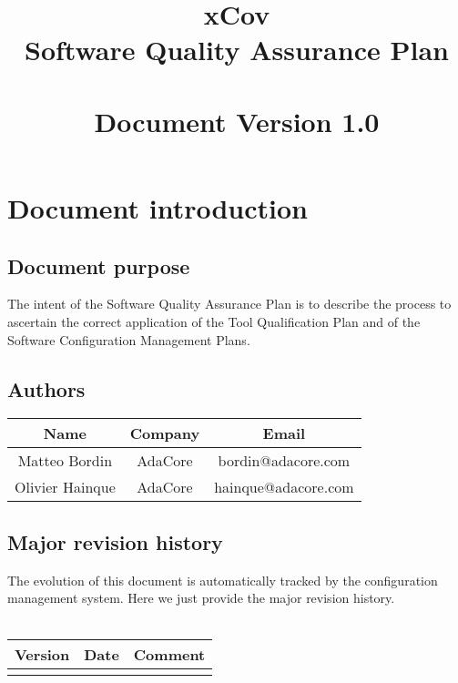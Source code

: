 \documentclass {report}
\begin{document}
\title{\huge xCov\\Software Quality Assurance Plan\\ \ \\ \large \textbf{Document Version 1.0}}

\maketitle
\tableofcontents

\chapter{Document introduction}

\section{Document purpose}
The intent of the Software Quality Assurance Plan is to describe the process to ascertain the correct application of the Tool Qualification Plan and of the Software Configuration Management Plans.

\section{Authors}
\begin{tabular}{|c|c|c|}
\hline
\textbf{Name} & \textbf{Company} & \textbf{Email} \\ \hline
Matteo Bordin & AdaCore & bordin@adacore.com \\ \hline
Olivier Hainque & AdaCore & hainque@adacore.com \\ \hline
\end{tabular}

\section{Major revision history}
The evolution of this document is automatically tracked by the configuration management system. Here we just provide the major revision history.
\ \\ \\
\begin{tabular}{|c|c|c|}
\hline
\textbf{Version} & \textbf{Date} & \textbf{Comment} \\ \hline
 &  &  \\ \hline
\end{tabular}


\end{document}
